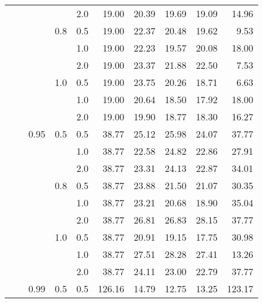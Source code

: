 \documentclass{article}
\begin{document}
{\begin{tabular}{lllllrrrrr}
            &     &      &     & 2.0 &   19.00 &   20.39 &             19.69 &                19.09 &      14.96 \\
            &     &      & 0.8 & 0.5 &   19.00 &   22.37 &             20.48 &                19.62 &       9.53 \\
            &     &      &     & 1.0 &   19.00 &   22.23 &             19.57 &                20.08 &      18.00 \\
            &     &      &     & 2.0 &   19.00 &   23.37 &             21.88 &                22.50 &       7.53 \\
            &     &      & 1.0 & 0.5 &   19.00 &   23.75 &             20.26 &                18.71 &       6.63 \\
            &     &      &     & 1.0 &   19.00 &   20.64 &             18.50 &                17.92 &      18.00 \\
            &     &      &     & 2.0 &   19.00 &   19.90 &             18.77 &                18.30 &      16.27 \\
            &     & 0.95 & 0.5 & 0.5 &   38.77 &   25.12 &             25.98 &                24.07 &      37.77 \\
            &     &      &     & 1.0 &   38.77 &   22.58 &             24.82 &                22.86 &      27.91 \\
            &     &      &     & 2.0 &   38.77 &   23.31 &             24.13 &                22.87 &      34.01 \\
            &     &      & 0.8 & 0.5 &   38.77 &   23.88 &             21.50 &                21.07 &      30.35 \\
            &     &      &     & 1.0 &   38.77 &   23.21 &             20.68 &                18.90 &      35.04 \\
            &     &      &     & 2.0 &   38.77 &   26.81 &             26.83 &                28.15 &      37.77 \\
            &     &      & 1.0 & 0.5 &   38.77 &   20.91 &             19.15 &                17.75 &      30.98 \\
            &     &      &     & 1.0 &   38.77 &   27.51 &             28.28 &                27.41 &      13.26 \\
            &     &      &     & 2.0 &   38.77 &   24.11 &             23.00 &                22.79 &      37.77 \\
            &     & 0.99 & 0.5 & 0.5 &  126.16 &   14.79 &             12.75 &                13.25 &     123.17 \\

\end{tabular}}
\end{document}
